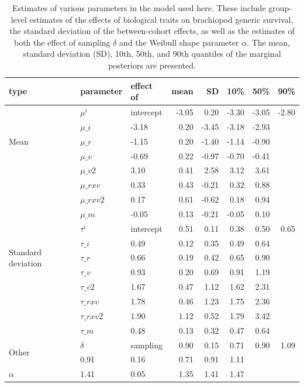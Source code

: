 \documentclass{article}
\begin{document}
\clearpage






\clearpage


\begin{table}
  \centering
  \caption{Estimates of various parameters in the model used here. These include group-level estimates of the effects of biological traits on brachiopod generic survival, the standard deviation of the between-cohort effects, as well as the estimates of both the effect of sampling \(\delta\) and the Weibull shape parameter \(\alpha\). The mean, standard deviation (SD), 10th, 50th, and 90th quantiles of the marginal posteriors are presented.}
  \begin{tabular}{ l | l p{2.5cm} r r r r r }
    \hline
    type & parameter & effect of & mean & SD & 10\% & 50\% & 90\% \\ 
    \hline
    \multirow{5}{*}{Mean} & \(\mu^{i}\) & intercept & -3.05 & 0.20 & -3.30 & -3.05 & -2.80 \\
    & \(\mu\_{i}\) & -3.18 & 0.20 & -3.45 & -3.18 & -2.93 \\ 
    & \(\mu\_{r}\) & -1.15 & 0.20 & -1.40 & -1.14 & -0.90 \\ 
    & \(\mu\_{v}\) & -0.69 & 0.22 & -0.97 & -0.70 & -0.41 \\ 
    & \(\mu\_{v2}\) & 3.10 & 0.41 & 2.58 & 3.12 & 3.61 \\ 
    & \(\mu\_{rxv}\) & 0.33 & 0.43 & -0.21 & 0.32 & 0.88 \\ 
    & \(\mu\_{rxv2}\) & 0.17 & 0.61 & -0.62 & 0.18 & 0.94 \\ 
    & \(\mu\_{m}\) & -0.05 & 0.13 & -0.21 & -0.05 & 0.10 \\ 
    \hline
    \multirow{5}{*}{Standard deviation} & \(\tau^{i}\) & intercept & 0.51 & 0.11 & 0.38 & 0.50 & 0.65 \\
    & \(\tau\_{i}\) & 0.49 & 0.12 & 0.35 & 0.49 & 0.64 \\ 
    & \(\tau\_{r}\) & 0.66 & 0.19 & 0.42 & 0.65 & 0.90 \\ 
    & \(\tau\_{v}\) & 0.93 & 0.20 & 0.69 & 0.91 & 1.19 \\ 
    & \(\tau\_{v2}\) & 1.67 & 0.47 & 1.12 & 1.62 & 2.31 \\ 
    & \(\tau\_{rxv}\) & 1.78 & 0.46 & 1.23 & 1.75 & 2.36 \\ 
    & \(\tau\_{rxv2}\) & 1.90 & 1.12 & 0.52 & 1.79 & 3.42 \\ 
    & \(\tau\_{m}\) & 0.48 & 0.13 & 0.32 & 0.47 & 0.64 \\ 
    \hline
    \multirow{2}{*}{Other} & \(\delta\) & sampling & 0.90 & 0.15 & 0.71 & 0.90 & 1.09 \\ 
    \(\delta\) & 0.91 & 0.16 & 0.71 & 0.91 & 1.11 \\ 
    \(\alpha\) & 1.41 & 0.05 & 1.35 & 1.41 & 1.47 \\ 
    \hline
  \end{tabular}
  \label{tab:param}
\end{table}
\end{document}
